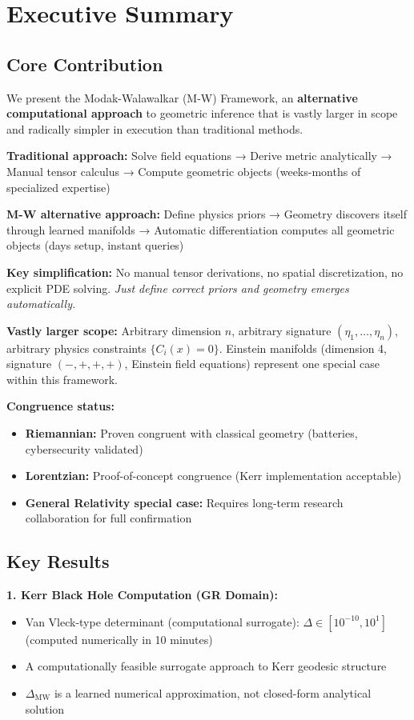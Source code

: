 \documentclass[11pt,a4paper]{article}
\begin{document}
\section*{Executive Summary}

\subsection*{Core Contribution}

We present the Modak-Walawalkar (M-W) Framework, an \textbf{alternative computational approach} to geometric inference that is vastly larger in scope and radically simpler in execution than traditional methods.

\textbf{Traditional approach:} Solve field equations → Derive metric analytically → Manual tensor calculus → Compute geometric objects (weeks-months of specialized expertise)

\textbf{M-W alternative approach:} Define physics priors → Geometry discovers itself through learned manifolds → Automatic differentiation computes all geometric objects (days setup, instant queries)

\textbf{Key simplification:} No manual tensor derivations, no spatial discretization, no explicit PDE solving. \emph{Just define correct priors and geometry emerges automatically.}

\textbf{Vastly larger scope:} Arbitrary dimension $n$, arbitrary signature $(\eta_1, \ldots, \eta_n)$, arbitrary physics constraints $\{C_i(x)=0\}$. Einstein manifolds (dimension 4, signature $(-,+,+,+)$, Einstein field equations) represent one special case within this framework.

\textbf{Congruence status:}
\begin{itemize}
\item \textbf{Riemannian:} Proven congruent with classical geometry (batteries, cybersecurity validated)
\item \textbf{Lorentzian:} Proof-of-concept congruence (Kerr implementation acceptable)
\item \textbf{General Relativity special case:} Requires long-term research collaboration for full confirmation
\end{itemize}

\subsection*{Key Results}

\textbf{1. Kerr Black Hole Computation (GR Domain):}
\begin{itemize}
\item Van Vleck-type determinant (computational surrogate): $\Delta \in [10^{-10}, 10^{1}]$ (computed numerically in 10 minutes)
\item A computationally feasible surrogate approach to Kerr geodesic structure
\item $\Delta_{\text{MW}}$ is a learned numerical approximation, not closed-form analytical solution
\end{itemize}
\end{document}
